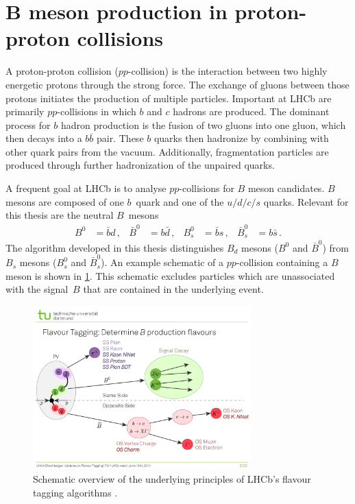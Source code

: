 \section[\texorpdfstring{$B$}{B} meson production in proton-proton collisions]{\texorpdfstring{$\symbf{B}$}{B} meson production in proton-proton collisions}
\label{sec:B_mesons}

A proton-proton collision ($pp$-collision) is the interaction between two highly energetic protons through the strong force.
The exchange of gluons between those protons initiates the production of multiple particles. 
Important at LHCb are primarily $pp$-collisions in which $b$ and $c$ hadrons are produced.
The dominant process for $b$ hadron production is the fusion of two gluons into one gluon, which then decays into a $b\bar{b}$ pair.
These $b$ quarks then hadronize by combining with other quark pairs from the vacuum. 
Additionally, fragmentation particles are produced through further hadronization of the unpaired quarks.

A frequent goal at LHCb is to analyse $pp$-collisions for $B$ meson candidates.
$B$ mesons are composed of one $b$~quark and one of the $u/d/c/s$ quarks.
Relevant for this thesis are the neutral $B$~mesons
\begin{align*}
    B^0 &= \bar{b}d \, , & \bar{B}^0 &= b\bar{d} \, , & B_s^0 &= \bar{b}s \, , & \bar{B}_s^0 &= b\bar{s} \, .
\end{align*}
The algorithm developed in this thesis distinguishes $B_d$ mesons ($B^0$ and $\bar{B}^0$) from $B_s$ mesons ($B_s^0$ and $\bar{B}_s^0$).
An example schematic of a $pp$-collision containing a $B$ meson is shown in \cref{fig:ft_scheme}. 
This schematic excludes particles which are unassociated with the signal~$B$ that are contained in the underlying event.

\begin{figure}
    \centering
    \includegraphics[width=0.75\textwidth]{images/FlavourTaggingScheme.pdf}
    \caption{Schematic overview of the underlying principles of LHCb's flavour tagging algorithms \cite{ft_scheme}.}
    \label{fig:ft_scheme}
\end{figure}

